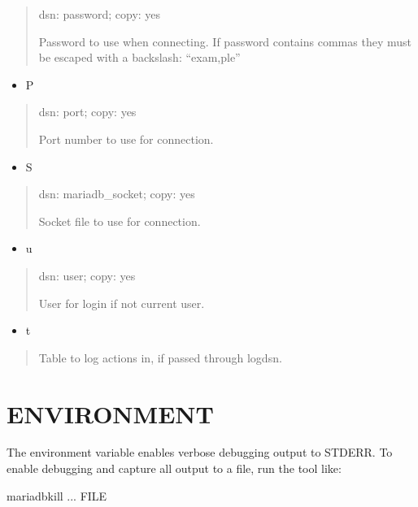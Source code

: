 \documentclass[letterpaper,10pt,english]{sphinxmanual}
\begin{document}
\begin{quote}

dsn: password; copy: yes

Password to use when connecting.
If password contains commas they must be escaped with a backslash: “exam,ple”
\end{quote}
\begin{itemize}
\item {} 
P

\end{itemize}
\begin{quote}

dsn: port; copy: yes

Port number to use for connection.
\end{quote}
\begin{itemize}
\item {} 
S

\end{itemize}
\begin{quote}

dsn: mariadb\_socket; copy: yes

Socket file to use for connection.
\end{quote}
\begin{itemize}
\item {} 
u

\end{itemize}
\begin{quote}

dsn: user; copy: yes

User for login if not current user.
\end{quote}
\begin{itemize}
\item {} 
t

\end{itemize}
\begin{quote}

Table to log actions in, if passed through \textendash{}log\sphinxhyphen{}dsn.
\end{quote}


\section{ENVIRONMENT}
\label{\detokenize{mariadb-kill:environment}}
The environment variable  enables verbose debugging output to STDERR.
To enable debugging and capture all output to a file, run the tool like:

\begin{sphinxVerbatim}[commandchars=\\\{\}]
 mariadb\PYGZhy{}kill ... \PYGZgt{} FILE \PYGZgt{}
\end{sphinxVerbatim}
\end{document}
